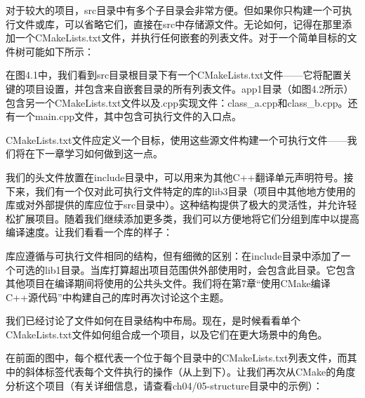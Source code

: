 对于较大的项目，src目录中有多个子目录会非常方便。但如果你只构建一个可执行文件或库，可以省略它们，直接在src中存储源文件。无论如何，记得在那里添加一个CMakeLists.txt文件，并执行任何嵌套的列表文件。对于一个简单目标的文件树可能如下所示：


在图4.1中，我们看到src目录根目录下有一个CMakeLists.txt文件——它将配置关键的项目设置，并包含来自嵌套目录的所有列表文件。app1目录（如图4.2所示）包含另一个CMakeLists.txt文件以及.cpp实现文件：class\_a.cpp和class\_b.cpp。还有一个main.cpp文件，其中包含可执行文件的入口点。

CMakeLists.txt文件应定义一个目标，使用这些源文件构建一个可执行文件——我们将在下一章学习如何做到这一点。

我们的头文件放置在include目录中，可以用来为其他C++翻译单元声明符号。接下来，我们有一个仅对此可执行文件特定的库的lib3目录（项目中其他地方使用的库或对外部提供的库应位于src目录中）。这种结构提供了极大的灵活性，并允许轻松扩展项目。随着我们继续添加更多类，我们可以方便地将它们分组到库中以提高编译速度。让我们看看一个库的样子：


库应遵循与可执行文件相同的结构，但有细微的区别：在include目录中添加了一个可选的lib1目录。当库打算超出项目范围供外部使用时，会包含此目录。它包含其他项目在编译期间将使用的公共头文件。我们将在第7章“使用CMake编译C++源代码”中构建自己的库时再次讨论这个主题。

我们已经讨论了文件如何在目录结构中布局。现在，是时候看看单个CMakeLists.txt文件如何组合成一个项目，以及它们在更大场景中的角色。


在前面的图中，每个框代表一个位于每个目录中的CMakeLists.txt列表文件，而其中的斜体标签代表每个文件执行的操作（从上到下）。让我们再次从CMake的角度分析这个项目（有关详细信息，请查看ch04/05-structure目录中的示例）：

